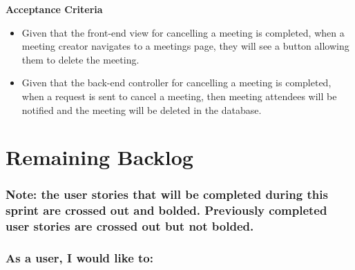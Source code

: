 \documentclass[12pt]{article}
\newcommand{\brbig}{\vspace{4mm}}
\begin{document}
\brbig

\textbf{Acceptance Criteria}
\begin{itemize}
\item Given that the front-end view for cancelling a meeting is completed, when a meeting creator navigates to a meetings page, they will see a button allowing them to delete the meeting.
\item Given that the back-end controller for cancelling a meeting is completed, when a request is sent to cancel a meeting, then meeting attendees will be notified and the meeting will be deleted in the database.
\end{itemize}

\newpage

\section{Remaining Backlog}

\subsubsection*{Note: the user stories that will be completed during this sprint are crossed out and bolded. Previously completed user stories are crossed out but not bolded.}

\subsubsection*{As a user, I would like to:}
\end{document}

